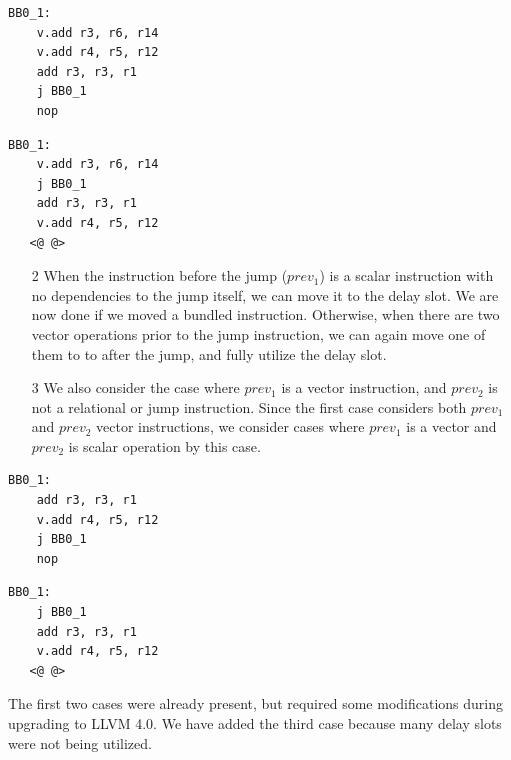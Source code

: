 \label{lst:delayslot2}
\begin{center}
\hspace{2px}\begin{minipage}{.475\textwidth}
\begin{lstlisting}[frame=tlrb]
BB0_1:
    v.add r3, r6, r14
    v.add r4, r5, r12
    add r3, r3, r1
    j BB0_1
    nop
\end{lstlisting}
\end{minipage}\hfill
\begin{minipage}{.475\textwidth}
\begin{lstlisting}[frame=tlrb]
BB0_1:
    v.add r3, r6, r14
    j BB0_1
    add r3, r3, r1
    v.add r4, r5, r12
   <@ @>
\end{lstlisting}
\end{minipage}
\end{center}

\begin{enumerate}
\item[2] When the instruction before the jump ($prev_1$) is a scalar instruction with no dependencies to the jump itself, we can move it to the delay slot. We are now done if we moved a bundled instruction. Otherwise, when there are two vector operations prior to the jump instruction, we can again move one of them to to after the jump, and fully utilize the delay slot.

\item[3] We also consider the case where $prev_1$ is a vector instruction, and $prev_2$ is not a relational or jump instruction. Since the first case considers both $prev_1$ and $prev_2$ vector instructions, we consider cases where $prev_1$ is a vector and $prev_2$ is scalar operation by this case. %
\end{enumerate}

\label{lst:delayslot3}
\begin{center}
\hspace{2px}\begin{minipage}{.475\textwidth}
\begin{lstlisting}[frame=tlrb]
BB0_1:
    add r3, r3, r1
    v.add r4, r5, r12
    j BB0_1
    nop
\end{lstlisting}
\end{minipage}\hfill
\begin{minipage}{.475\textwidth}
\begin{lstlisting}[frame=tlrb]
BB0_1:
    j BB0_1
    add r3, r3, r1
    v.add r4, r5, r12
   <@ @>
\end{lstlisting}
\end{minipage}
\end{center}
The first two cases were already present, but required some modifications during upgrading to LLVM 4.0. We have added the third case because many delay slots were not being utilized.

